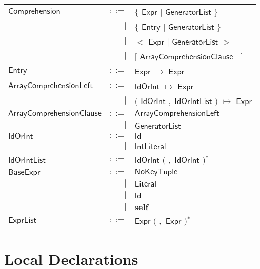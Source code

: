 \begin{longtable}[l]{p{3cm}rl}
$\mathsf{Comprehension}$ &  $\mathsf{::=}$  & $\mathbf{\{}$ $\mathsf{Expr}$ $\big|$ $\mathsf{GeneratorList}$ $\mathbf{\}}$ \\
 & $\big|$ &  $\mathbf{\{}$ $\mathsf{Entry}$ $\big|$ $\mathsf{GeneratorList}$ $\mathbf{\}}$ \\
 & $\big|$ &  $\mathbf{<}$ $\mathsf{Expr}$ $\big|$ $\mathsf{GeneratorList}$ $\mathbf{>}$ \\
 & $\big|$ &  $\mathbf{[}$ $\mathsf{ArrayComprehensionClause}$$^+$ $\mathbf{]}$ \\
$\mathsf{Entry}$ &  $\mathsf{::=}$  & $\mathsf{Expr}$ $\mathbf{\mapsto}$ $\mathsf{Expr}$ \\
$\mathsf{ArrayComprehensionLeft}$ &  $\mathsf{::=}$  & $\mathsf{IdOrInt}$ $\mathbf{\mapsto}$ $\mathsf{Expr}$ \\
 & $\big|$ &  $\big($  $\mathsf{IdOrInt}$ $\mathbf{,}$ $\mathsf{IdOrIntList}$ $\big)$ $\mathbf{\mapsto}$ $\mathsf{Expr}$ \\
$\mathsf{ArrayComprehensionClause}$ &  $\mathsf{::=}$  & $\mathsf{ArrayComprehensionLeft}$ \\
 & $\big|$ &  $\mathsf{GeneratorList}$ \\
$\mathsf{IdOrInt}$ &  $\mathsf{::=}$  & $\mathsf{Id}$ \\
 & $\big|$ &  $\mathsf{IntLiteral}$ \\
$\mathsf{IdOrIntList}$ &  $\mathsf{::=}$  & $\mathsf{IdOrInt}$ $\big($  $\mathbf{,}$ $\mathsf{IdOrInt}$ $\big)$$^*$ \\
$\mathsf{BaseExpr}$ &  $\mathsf{::=}$  & $\mathsf{NoKeyTuple}$ \\
 & $\big|$ &  $\mathsf{Literal}$ \\
 & $\big|$ &  $\mathsf{Id}$ \\
 & $\big|$ &  $\mathbf{self}$ \\
$\mathsf{ExprList}$ &  $\mathsf{::=}$  & $\mathsf{Expr}$ $\big($  $\mathbf{,}$ $\mathsf{Expr}$ $\big)$$^*$ \\
\end{longtable} \hfill 

\section{Local Declarations} 

